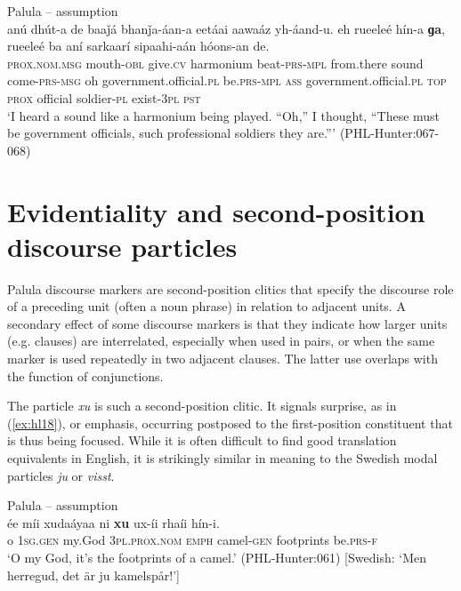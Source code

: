 \documentclass[output=paper]{langsci/langscibook}
\begin{document}
\begin{exe}
	\ex Palula -- assumption \label{ex:hl17}\\
	\gll anú dhút-a de baaǰá bhanǰa-áan-a eetáai aawaáz yh-áand-u. eh rueeleé hín-a \textbf{ɡa}, rueeleé ba aní sarkaarí sipaahi-aán hóons-an de.\\
	\textsc{prox}.\textsc{nom}.\textsc{msg} mouth-\textsc{obl} give.\textsc{cv} harmonium beat-\textsc{prs}-\textsc{mpl} from.there sound come-\textsc{prs}-\textsc{msg} oh government.official.\textsc{pl} be.\textsc{prs}-\textsc{mpl} \textsc{ass} government.official.\textsc{pl} \textsc{top} \textsc{prox} official soldier-\textsc{pl} exist-3\textsc{pl} \textsc{pst}\\
	\trans ‘I heard a sound like a harmonium being played. “Oh,” I thought, “These must be government officials, such professional soldiers they are.”’ (PHL-Hunter:067-068)
\end{exe}


\section{Evidentiality and second-position discourse particles}\label{s:hl5}

Palula discourse markers are second-position clitics that specify the discourse role of a preceding unit (often a noun phrase) in relation to adjacent units. A secondary effect of some discourse markers is that they indicate how larger units (e.g. clauses) are interrelated, especially when used in pairs, or when the same marker is used repeatedly in two adjacent clauses. The latter use overlaps with the function of conjunctions.
 
The particle \textit{xu} is such a second-position clitic. It signals surprise, as in ‎(\ref{ex:hl18}), or emphasis, occurring postposed to the first-position constituent that is thus being focused. While it is often difficult to find good translation equivalents in English, it is strikingly similar in meaning to the Swedish modal particles \textit{ju} or \textit{visst}.

\begin{exe}
	\ex Palula -- assumption \label{ex:hl18}\\
	\gll ée míi xudaáyaa ni \textbf{xu} ux-íi rhaíi hín-i.\\
	o 1\textsc{sg}.\textsc{gen} my.God 3\textsc{pl}.\textsc{prox}.\textsc{nom} \textsc{emph} camel-\textsc{gen} footprints be.\textsc{prs}-\textsc{f}\\
	\trans ‘O my God, it’s the footprints of a camel.’ (PHL-Hunter:061) [Swedish: ‘Men herregud, det är ju kamelspår!’]
\end{exe}
\end{document}
